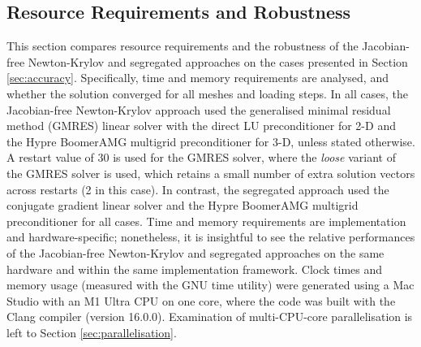 \documentclass[sn-mathphys,Numbered]{sn-jnl}%
\begin{document}
\subsection{Resource Requirements and Robustness}
\label{sec:resource_requirements}
This section compares resource requirements and the robustness of the Jacobian-free Newton-Krylov and segregated approaches on the cases presented in Section \ref{sec:accuracy}.
Specifically, time and memory requirements are analysed, and whether the solution converged for all meshes and loading steps.
In all cases, the Jacobian-free Newton-Krylov approach used the generalised minimal residual method (GMRES) linear solver with the direct LU preconditioner for 2-D and the Hypre BoomerAMG multigrid preconditioner for 3-D, unless stated otherwise.
A restart value of 30 is used for the GMRES solver, where the \emph{loose} variant of the GMRES solver is used, which retains a small number of extra solution vectors across restarts (2 in this case).
In contrast, the segregated approach used the conjugate gradient linear solver and the Hypre BoomerAMG multigrid preconditioner for all cases.
Time and memory requirements are implementation and hardware-specific; nonetheless, it is insightful to see the relative performances of the Jacobian-free Newton-Krylov and segregated approaches on the same hardware and within the same implementation framework.
Clock times and memory usage (measured with the GNU time utility) were generated using a Mac Studio with an M1 Ultra CPU on one core, where the code was built with the Clang compiler (version 16.0.0).
Examination of multi-CPU-core parallelisation is left to Section \ref{sec:parallelisation}.
\end{document}
